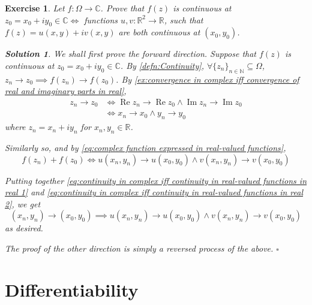 \documentclass[11pt, oneside]{book}
\theoremstyle{break}
\newtheorem*{solution}{Solution}
\newtheorem{ex}{Exercise}[section]
\DeclareMathOperator{\re}{Re}
\DeclareMathOperator{\im}{Im}
\newcommand{\qed}{\hfill\ensuremath{\square}}   %
\begin{document}
\begin{ex}\label{ex:continuity in complex iff continuity in real-valued functions in real}
	Let $f: \Omega \to \mathbb{C}$. Prove that $f(z)$ is continuous at $z_0 = x_0 + iy_0 \in \mathbb{C} \iff$ functions $u, v: \mathbb{R}^2 \to \mathbb{R}$, such that $f(z) = u(x, y) + iv(x,y)$ are both continuous at $(x_0, y_0)$.

	\begin{solution}
		We shall first prove the forward direction. Suppose that $f(z)$ is continuous at $z_0 = x_0 + iy_0 \in \mathbb{C}$. By \cref{defn:Continuity}, $\forall \{z_n\}_{n \in \mathbb{N}} \subseteq \Omega$, $z_n \to z_0 \implies f(z_n) \to f(z_0)$. By \cref{ex:convergence in complex iff convergence of real and imaginary parts in real},
		\begin{align}
			z_n \to z_0 &\iff \re z_n \to \re z_0 \land \im z_n \to \im z_0 \nonumber \\
				&\iff x_n \to x_0 \land y_n \to y_0 \label{eq:continuity in complex iff continuity in real-valued functions in real 1}
		\end{align}
		where $z_n = x_n + iy_n$ for $x_n, y_n \in \mathbb{R}$.

		Similarly so, and by \cref{eq:complex function expressed in real-valued functions},
		\begin{equation}\label{eq:continuity in complex iff continuity in real-valued functions in real 2}
			f(z_n) + f(z_0) \iff u(x_n, y_n) \to u(x_0, y_0) \land v(x_n, y_n) \to v(x_0, y_0)
		\end{equation}

		Putting together \cref{eq:continuity in complex iff continuity in real-valued functions in real 1} and \cref{eq:continuity in complex iff continuity in real-valued functions in real 2}, we get
		\begin{equation*}
			(x_n, y_n) \to (x_0, y_0) \implies u(x_n, y_n) \to u(x_0, y_0) \land v(x_n, y_n) \to v(x_0, y_0)
		\end{equation*}
		as desired.

		The proof of the other direction is simply a reversed process of the above. \qed
	\end{solution}
\end{ex}


\section{Differentiability} %
\label{sec:differentiability}
\end{document}
